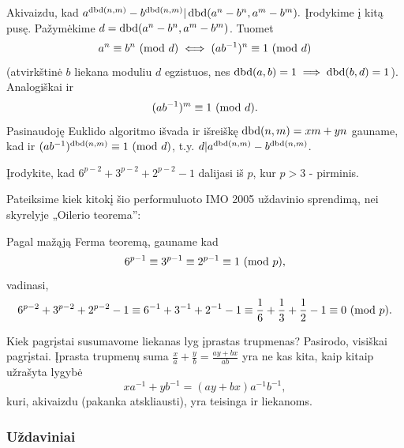 \begin{sprendimas}
Akivaizdu, kad $a^{\operatorname{dbd}(n,m)}-b^{\operatorname{dbd}(n,m)} | \operatorname{dbd}(a^n - b^n, a^m - b^m).$
Įrodykime į kitą pusę. Pažymėkime $d = \operatorname{dbd}(a^n - b^n, a^m - b^m)$. Tuomet
$$a^n \equiv b^n \ (\text{mod } d) \iff (ab^{-1})^n \equiv 1 \ (\text{mod } d)$$ (atvirkštinė $b$
liekana moduliu $d$ egzistuos, nes $\operatorname{dbd}(a,b)=1 \implies \operatorname{dbd}(b,d)=1$).
Analogiškai ir $$(ab^{-1})^m \equiv 1 \ (\text{mod } d).$$ Pasinaudoję Euklido algoritmo
išvada ir išreiškę $\operatorname{dbd}(n,m) = xm + yn$ gauname, kad ir
$(ab^{-1})^{\operatorname{dbd}(n,m)} \equiv 1 \ (\text{mod } d)$, t.y.
$d|a^{\operatorname{dbd}(n,m)}-b^{\operatorname{dbd}(n,m)}$.
\end{sprendimas}

\begin{pavnr}
  Įrodykite, kad $6^{p-2} + 3^{p-2} +  2^{p-2} - 1$ dalijasi iš $p$, kur
  $p>3$ - pirminis.
\end{pavnr}

\begin{sprendimas}
  Pateiksime kiek kitokį šio performuluoto IMO 2005 uždavinio sprendimą,
  nei skyrelyje „Oilerio teorema'':

  Pagal mažąją Ferma teoremą, gauname kad
  $$6^{p-1} \equiv 3^{p-1} \equiv  2^{p-1} \equiv 1\ (\text{mod } p),$$ vadinasi,
  $$6^{p-2} + 3^{p-2} +  2^{p-2} - 1 \equiv 6^{-1} + 3^{-1} + 2^{-1} -1
  \equiv \frac{1}{6} + \frac{1}{3} + \frac{1}{2} - 1 \equiv 0\ (\text{mod } p).$$

  Kiek pagrįstai susumavome liekanas lyg įprastas trupmenas? Pasirodo,
  visiškai pagrįstai. Įprasta trupmenų suma $\frac{x}{a} + \frac{y}{b} =
  \frac{ay+bx}{ab}$ yra ne kas kita, kaip kitaip užrašyta lygybė
  $$xa^{-1} + yb^{-1} = (ay + bx)a^{-1}b^{-1},$$ kuri, akivaizdu (pakanka
  atskliausti), yra teisinga ir liekanoms.
\end{sprendimas}



\subsubsection{Uždaviniai}

